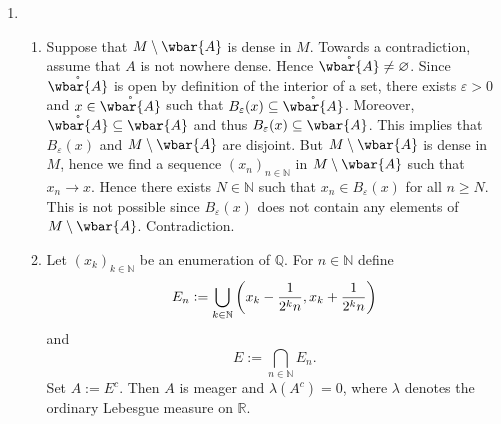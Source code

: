 \begin{enumerate}[label = \textbf{Exercise \arabic*.},wide = 0pt, itemsep = 1.5ex]
	\item 
		~
		\begin{enumerate}[label = \textbf{\alph*.},wide = 0pt, itemsep = 1.5ex]
			\item Suppose that $M \setminus \wbar{A}$ is dense in $M$. Towards a contradiction, assume that $A$ is not nowhere dense. Hence $\mathring{\wbar{A}} \neq \varnothing$. Since $\mathring{\wbar{A}}$ is open by definition of the interior of a set, there exists $\varepsilon > 0$ and $x \in \mathring{\wbar{A}}$ such that $B_\varepsilon(x) \subseteq \mathring{\wbar{A}}$. Moreover, $\mathring{\wbar{A}} \subseteq \wbar{A}$ and thus $B_\varepsilon(x) \subseteq \wbar{A}$. This implies that $B_\varepsilon(x)$ and $M \setminus \wbar{A}$ are disjoint. But $M \setminus \wbar{A}$ is dense in $M$, hence we find a sequence $(x_n)_{n \in \mathbb{N}}$ in $M \setminus \wbar{A}$ such that $x_n \to x$. Hence there exists $N \in \mathbb{N}$ such that $x_n \in B_\varepsilon(x)$ for all $n \geq N$. This is not possible since $B_\varepsilon(x)$ does not contain any elements of $M \setminus \wbar{A}$. Contradiction. 

			\item 
				\begin{lemma}
					Let $(x_k)_{k \in \mathbb{N}}$ be an enumeration of $\mathbb{Q}$. For $n \in \mathbb{N}$ define
					\begin{equation}
						E_n := \bigcup_{k \in \mathbb{N}} \intoo[3]{x_k - \frac{1}{2^kn},x_k + \frac{1}{2^kn}}
					\end{equation}
					\noindent and
					\begin{equation}
						E := \bigcap_{n \in \mathbb{N}} E_n.
					\end{equation}
					Set $A := E^c$. Then $A$ is meager and $\lambda(A^c) = 0$, where $\lambda$ denotes the ordinary Lebesgue measure on $\mathbb{R}$. 
				\end{lemma}


\end{enumerate}
\end{enumerate}
